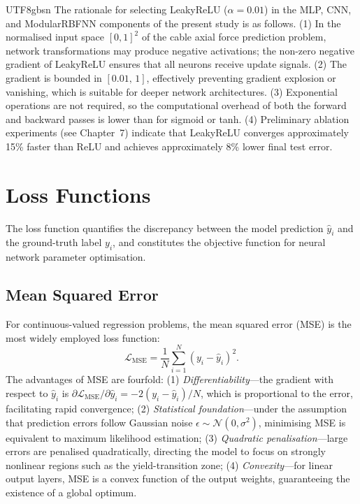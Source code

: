 \documentclass[a4paper,12pt]{report}
\begin{document}
\begin{CJK}{UTF8}{gbsn}
The rationale for selecting LeakyReLU ($\alpha = 0.01$) in the MLP, CNN, and
ModularRBFNN components of the present study is as follows. (1) In the normalised input
space $[0,1]^2$ of the cable axial force prediction problem, network transformations may
produce negative activations; the non-zero negative gradient of LeakyReLU ensures that
all neurons receive update signals. (2) The gradient is bounded in $[0.01,\,1]$,
effectively preventing gradient explosion or vanishing, which is suitable for deeper
network architectures. (3) Exponential operations are not required, so the computational
overhead of both the forward and backward passes is lower than for sigmoid or tanh.
(4) Preliminary ablation experiments (see Chapter~7) indicate that LeakyReLU converges
approximately 15\% faster than ReLU and achieves approximately 8\% lower final test error.

\section{Loss Functions}
\label{sec:loss}

The loss function quantifies the discrepancy between the model prediction $\hat{y}_i$ and
the ground-truth label $y_i$, and constitutes the objective function for neural network
parameter optimisation.

\subsection{Mean Squared Error}
\label{subsec:mse}

For continuous-valued regression problems, the mean squared error (MSE) is the most
widely employed loss function:
\begin{equation}
  \mathcal{L}_{\text{MSE}} = \frac{1}{N} \sum_{i=1}^{N} (y_i - \hat{y}_i)^2.
  \label{eq:mse}
\end{equation}
The advantages of MSE are fourfold: (1) \textit{Differentiability}---the gradient with
respect to $\hat{y}_i$ is $\partial\mathcal{L}_{\text{MSE}}/\partial\hat{y}_i =
-2(y_i-\hat{y}_i)/N$, which is proportional to the error, facilitating rapid convergence;
(2) \textit{Statistical foundation}---under the assumption that prediction errors follow
Gaussian noise $\epsilon \sim \mathcal{N}(0,\sigma^2)$, minimising MSE is equivalent to
maximum likelihood estimation; (3) \textit{Quadratic penalisation}---large errors are
penalised quadratically, directing the model to focus on strongly nonlinear regions such
as the yield-transition zone; (4) \textit{Convexity}---for linear output layers, MSE is
a convex function of the output weights, guaranteeing the existence of a global optimum.


\end{CJK}
\end{document}
